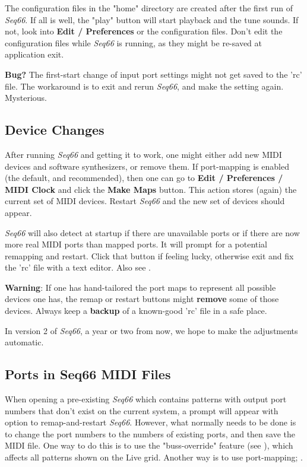    The configuration files in the "home" directory
   are created after the first run of \textsl{Seq66}.
   If all is well, the "play" button will start playback and the tune sounds.
   If not, look into \textbf{Edit / Preferences} or the configuration files.
   Don't edit the configuration files while \textsl{Seq66} is running, as
   they might be re-saved at application exit.

   \textbf{Bug?}
      The first-start change of input port settings might not get saved
      to the 'rc' file. The workaround is to exit and rerun
      \textsl{Seq66}, and make the setting again.
      Mysterious.

\subsection{Device Changes}
\label{subsec:introduction_device_changes}

   After running \textsl{Seq66} and getting it to work, one might
   either add new MIDI devices and software synthesizers, or remove
   them.
   If port-mapping is enabled (the default, and recommended), then
   one can go to
   \textbf{Edit / Preferences / MIDI Clock} and
   click the \textbf{Make Maps} button.
   This action stores (again) the current set of MIDI devices.
   Restart \textsl{Seq66} and the new set of devices should appear.

   \textsl{Seq66} will also detect at startup if there are unavailable
   ports or if there are now more real MIDI ports than mapped ports.
   It will prompt for a potential remapping and restart.
   Click that button if feeling lucky, otherwise
   exit and fix the 'rc' file with a text editor.
   Also see .

   \textbf{Warning}:
   If one has hand-tailored the port maps to represent all possible devices one
   has, the remap or restart buttons might \textbf{remove}
   some of those devices.
   Always keep a \textbf{backup}
   of a known-good 'rc' file in a safe place.

   In version 2 of \textsl{Seq66}, a year or two from now, we hope to make
   the adjustments automatic.

\subsection{Ports in Seq66 MIDI Files}
\label{subsec:introduction_ports}

   When opening a pre-existing \textsl{Seq66} which contains patterns with
   output port numbers that don't exist on the current system, a prompt
   will appear with option to remap-and-restart \textsl{Seq66}.
   However, what normally needs to be done is to change the
   port numbers to the numbers of existing ports, and then save the MIDI file.
   One way to do this is to use the "buss-override" feature
   (see ),
   which affects all patterns shown on the Live grid.
   Another way is to use port-mapping;
   .

